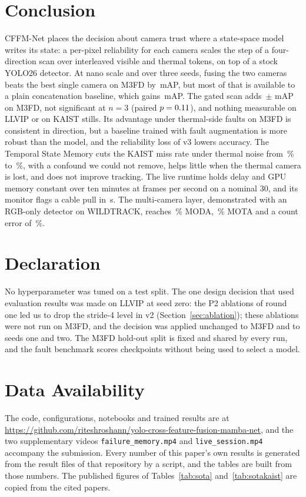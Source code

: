 \section{Conclusion}
\label{sec:conclusion}
CFFM-Net places the decision about camera trust where a state-space model writes its state: a per-pixel reliability for each camera scales the step of a four-direction scan over interleaved visible and thermal tokens, on top of a stock YOLO26 detector. At nano scale and over three seeds, fusing the two cameras beats the best single camera on M3FD by \gainMfdCffmVtwoOverBestMeanMap{}\,mAP, but most of that is available to a plain concatenation baseline, which gains \gainMfdConcatMdOverBestMeanMap{}\,mAP. The gated scan adds \marMfdVtwoVsConcatMdMeanMap{}\,$\pm$\,\marMfdVtwoVsConcatMdStdMap{}\,mAP on M3FD, not significant at $n=3$ (paired $p=0.11{}$), and nothing measurable on LLVIP or on KAIST stills. Its advantage under thermal-side faults on M3FD is consistent in direction, but a baseline trained with fault augmentation is more robust than the model, and the reliability loss of v3 lowers accuracy. The Temporal State Memory cuts the KAIST miss rate under thermal noise from \memThermalNoiseImageAllMr{}\,\% to \memThermalNoiseMemoryAllMr{}\,\%, with a confound we could not remove, helps little when the thermal camera is lost, and does not improve tracking. The live runtime holds delay and GPU memory constant over ten minutes at \livSoakThirtyFps{} frames per second on a nominal 30, and its monitor flags a cable pull in \livFaultOnUnpluggedDetectS{}\,s. The multi-camera layer, demonstrated with an RGB-only detector on WILDTRACK, reaches \camDetFineTunedModa{}\,\% MODA, \camTrackMota{}\,\% MOTA and a count error of \camCountRelErr{}\,\%.

\section*{Declaration}
No hyperparameter was tuned on a test split. The one design decision that used evaluation results was made on LLVIP at seed zero: the P2 ablations of round one led us to drop the stride-4 level in v2 (Section~\ref{sec:ablation}); these ablations were not run on M3FD, and the decision was applied unchanged to M3FD and to seeds one and two. The M3FD hold-out split is fixed and shared by every run, and the fault benchmark scores checkpoints without being used to select a model.

\section*{Data Availability}
The code, configurations, notebooks and trained results are at \url{https://github.com/riteshroshann/yolo-cross-feature-fusion-mamba-net}, and the two supplementary videos \texttt{failure\_memory.mp4} and \texttt{live\_session.mp4} accompany the submission. Every number of this paper's own results is generated from the result files of that repository by a script, and the tables are built from those numbers. The published figures of Tables~\ref{tab:sota} and~\ref{tab:sotakaist} are copied from the cited papers.
